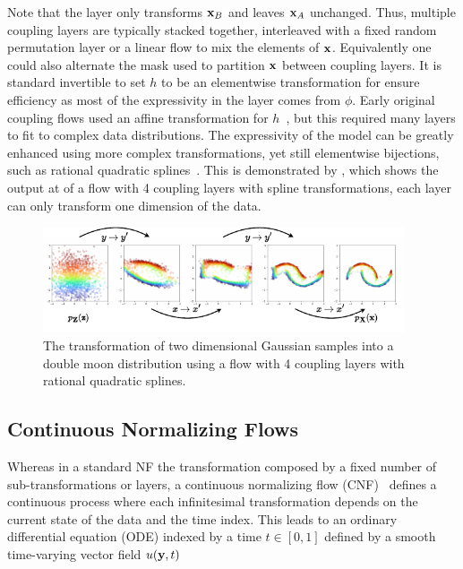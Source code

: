 Note that the layer only transforms $\mathbf{x}_B$ and leaves $\mathbf{x}_A$ unchanged.
Thus, multiple coupling layers are typically stacked together, interleaved with a fixed random permutation layer or a linear flow to mix the elements of $\mathbf{x}$.
Equivalently one could also alternate the mask used to partition $\mathbf{x}$ between coupling layers.
It is standard invertible to set $h$ to be an elementwise transformation for ensure efficiency as most of the expressivity in the layer comes from $\phi$.
Early original coupling flows used an affine transformation for $h$~\cite{RealNVP}, but this required many layers to fit to complex data distributions.
The expressivity of the model can be greatly enhanced using more complex transformations, yet still elementwise bijections, such as rational quadratic splines~\cite{NeuralSplineFlows}.
This is demonstrated by , which shows the output at of a flow with 4 coupling layers with spline transformations, each layer can only transform one dimension of the data.

\begin{figure}[ht]
    \centering
    \includegraphics[width=0.95\textwidth]{Figures/transformers/samples.pdf}
    \caption{The transformation of two dimensional Gaussian samples into a double moon distribution using a flow with 4 coupling layers with rational quadratic splines.}
    \label{fig:moons}
\end{figure}

\subsection{Continuous Normalizing Flows}


Whereas in a standard NF the transformation composed by a fixed number of sub-transformations or layers, a continuous normalizing flow (CNF)~\cite{NeuralODE} defines a continuous process where each infinitesimal transformation depends on the current state of the data and the time index.
This leads to an ordinary differential equation (ODE) indexed by a time $t \in [0, 1]$ defined by a smooth time-varying vector field $u(\mathbf{y}, t)$


